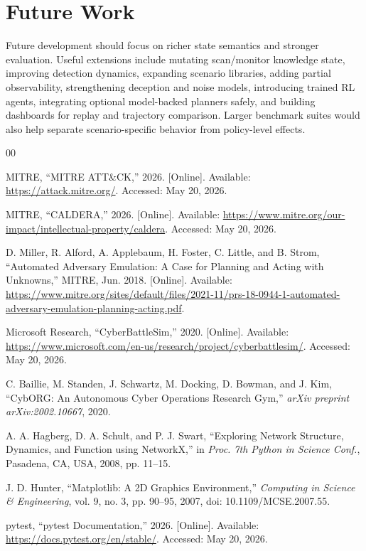 \documentclass[conference]{IEEEtran}
\begin{document}
\section{Future Work}
Future development should focus on richer state semantics and stronger evaluation. Useful extensions include mutating scan/monitor knowledge state, improving detection dynamics, expanding scenario libraries, adding partial observability, strengthening deception and noise models, introducing trained RL agents, integrating optional model-backed planners safely, and building dashboards for replay and trajectory comparison. Larger benchmark suites would also help separate scenario-specific behavior from policy-level effects.

\begin{thebibliography}{00}

MITRE, ``MITRE ATT\&CK,'' 2026. [Online]. Available: \url{https://attack.mitre.org/}. Accessed: May 20, 2026.

MITRE, ``CALDERA,'' 2026. [Online]. Available: \url{https://www.mitre.org/our-impact/intellectual-property/caldera}. Accessed: May 20, 2026.

D. Miller, R. Alford, A. Applebaum, H. Foster, C. Little, and B. Strom, ``Automated Adversary Emulation: A Case for Planning and Acting with Unknowns,'' MITRE, Jun. 2018. [Online]. Available: \url{https://www.mitre.org/sites/default/files/2021-11/prs-18-0944-1-automated-adversary-emulation-planning-acting.pdf}.

Microsoft Research, ``CyberBattleSim,'' 2020. [Online]. Available: \url{https://www.microsoft.com/en-us/research/project/cyberbattlesim/}. Accessed: May 20, 2026.

C. Baillie, M. Standen, J. Schwartz, M. Docking, D. Bowman, and J. Kim, ``CybORG: An Autonomous Cyber Operations Research Gym,'' \textit{arXiv preprint arXiv:2002.10667}, 2020.

A. A. Hagberg, D. A. Schult, and P. J. Swart, ``Exploring Network Structure, Dynamics, and Function using NetworkX,'' in \textit{Proc. 7th Python in Science Conf.}, Pasadena, CA, USA, 2008, pp. 11--15.

J. D. Hunter, ``Matplotlib: A 2D Graphics Environment,'' \textit{Computing in Science \& Engineering}, vol. 9, no. 3, pp. 90--95, 2007, doi: 10.1109/MCSE.2007.55.

pytest, ``pytest Documentation,'' 2026. [Online]. Available: \url{https://docs.pytest.org/en/stable/}. Accessed: May 20, 2026.


\end{thebibliography}
\end{document}
